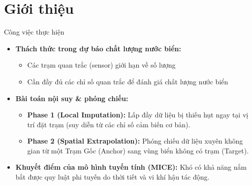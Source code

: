\section{Giới thiệu}

\begin{frame}{Công việc thực hiện}
  \begin{itemize}
    \item \textbf{Thách thức trong dự báo chất lượng nước biển:}
      \begin{itemize}
        \item Các trạm quan trắc (sensor) giới hạn về số lượng
        \item Cần đầy đủ các chỉ số quan trắc để đánh giá chất lượng nước biển
      \end{itemize}
    \item \textbf{Bài toán nội suy \& phóng chiếu:}
      \begin{itemize}
        \item \textbf{Phase 1 (Local Imputation):} Lấp đầy dữ liệu bị thiếu hụt ngay tại vị trí đặt trạm (suy diễn từ các chỉ số cảm biến cơ bản).
        \item \textbf{Phase 2 (Spatial Extrapolation):} Phóng chiếu dữ liệu xuyên không gian từ một Trạm Gốc (Anchor) sang vùng biển không có trạm (Target).
      \end{itemize}
    \item \textbf{Khuyết điểm của mô hình tuyến tính (MICE):} Khó có khả năng nắm bắt được quy luật phi tuyến do thời tiết và vi khí hậu tác động.
  \end{itemize}
\end{frame}
